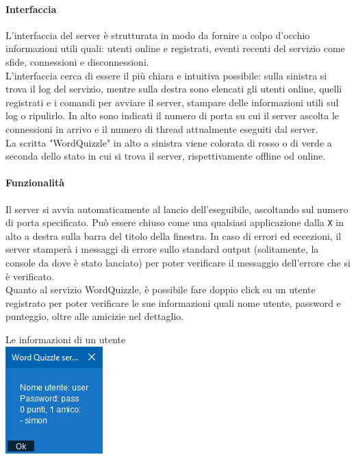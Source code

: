 \documentclass[10pt]{article}
\begin{document}
{\paragraph{Interfaccia} L'interfaccia del server è strutturata in modo da fornire a colpo d'occhio informazioni utili quali: utenti online e registrati, eventi recenti del servizio come sfide, connessioni e disconnessioni.\\
L'interfaccia cerca di essere il più chiara e intuitiva possibile: sulla sinistra si trova il log del servizio, mentre sulla destra sono elencati gli utenti online, quelli registrati e i comandi per avviare il server, stampare delle informazioni utili sul log o ripulirlo. In alto sono indicati il numero di porta su cui il server ascolta le connessioni in arrivo e il numero di thread attualmente eseguiti dal server.\\
La scritta "WordQuizzle" in alto a sinistra viene colorata di rosso o di verde a seconda dello stato in cui si trova il server, rispettivamente offline od online.
\paragraph{Funzionalità} Il server si avvia automaticamente al lancio dell'eseguibile, ascoltando sul numero di porta specificato. Può essere chiuso come una qualsiasi applicazione dalla \texttt{X} in alto a destra sulla barra del titolo della finestra. In caso di errori ed eccezioni, il server stamperà i messaggi di errore sullo standard output (solitamente, la console da dove è stato lanciato) per poter verificare il messaggio dell'errore che si è verificato.\\
Quanto al servizio WordQuizzle, è possibile fare doppio click su un utente registrato per poter verificare le sue informazioni quali nome utente, password e punteggio, oltre alle amicizie nel dettaglio.
\begin{center}
Le informazioni di un utente\\
\includegraphics[scale=1]{infouser.png}
\end{center}
\pagebreak
}
\end{document}
